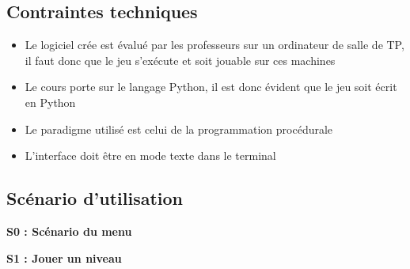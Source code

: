 \documentclass[a4paper,11pt]{article}
\begin{document}
\subsection{Contraintes techniques}

\begin{itemize}[label = $\bullet$]
	\item Le logiciel crée est évalué par les professeurs sur un ordinateur de salle de TP, il faut donc que le jeu s’exécute et soit jouable sur ces machines
	\item Le cours porte sur le langage Python, il est donc évident que le jeu soit écrit en Python
	\item Le paradigme utilisé est celui de la programmation procédurale
	\item L'interface doit être en mode texte dans le terminal
\end{itemize}

\subsection{Scénario d'utilisation}
\noindent
\textbf{S0 : Scénario du menu}\\[.5cm]

\noindent
\textbf{S1 : Jouer un niveau} \\[.5cm]
\end{document}
